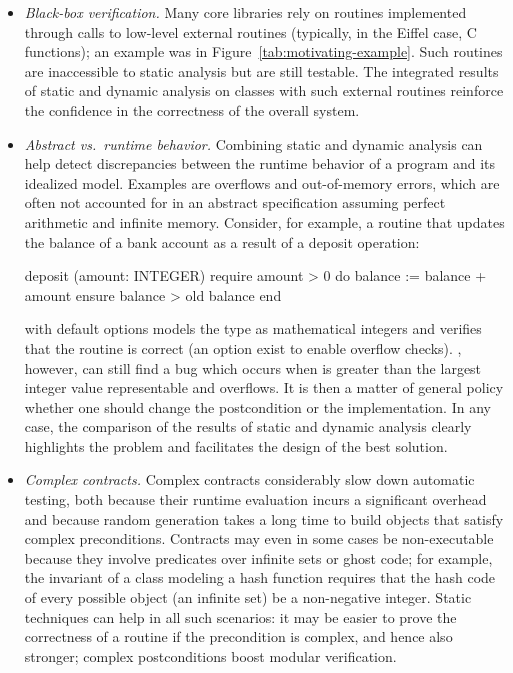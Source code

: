 \begin{itemize}
\item
\emph{Black-box verification.}
Many core libraries rely on routines implemented through calls to low-level external routines (typically, in the Eiffel case, C functions); an example was  in Figure~\ref{tab:motivating-example}.
Such routines are inaccessible to static analysis but are still testable. The integrated results of static and dynamic analysis on classes with such external routines reinforce the confidence in the correctness of the overall system.

\item
\emph{Abstract vs.~runtime behavior.}
Combining static and dynamic analysis can help detect discrepancies between the runtime behavior of a program and its idealized model.
Examples are overflows and out-of-memory errors, which are often not accounted for in an abstract specification assuming perfect arithmetic and infinite memory.
Consider, for example, a routine that updates the balance of a bank account as a result of a deposit operation:
\begin{erunning}
deposit (amount: INTEGER)
	require amount > 0
	do balance := balance + amount
	ensure balance > old balance
	end
\end{erunning}
\AutoProof with default options models the type  as mathematical integers and verifies that the routine is correct (an option exist to enable overflow checks).
\AutoTest, however, can still find a bug which occurs when  is greater than the largest integer value representable and  overflows.
It is then a matter of general policy whether one should change the postcondition or the implementation.
In any case, the comparison of the results of static and dynamic analysis clearly highlights the problem and facilitates the design of the best solution.

\item
\emph{Complex contracts.}
Complex contracts considerably slow down automatic testing, both because their runtime evaluation incurs a significant overhead and because random generation takes a long time to build objects that satisfy complex preconditions.
Contracts may even in some cases be non-executable because they involve predicates over infinite sets or ghost code; for example, the invariant of a class modeling a hash function requires that the hash code of every possible object (an infinite set) be a non-negative integer.
Static techniques can help in all such scenarios: it may be easier to prove the correctness of a routine if the precondition is complex, and hence also stronger; complex postconditions boost modular verification.
\end{itemize}


